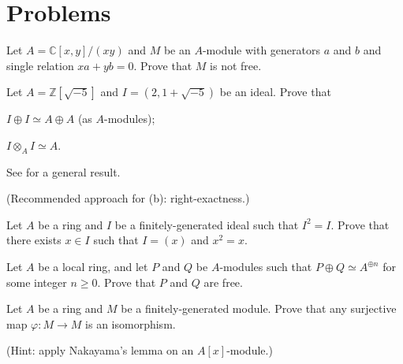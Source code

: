 \section{Problems}
\begin{problem}
\label{prob:diff_xy}
Let $A=\mathbb C[x,y]/(xy)$ and $M$ be an $A$-module with generators $a$ and $b$ and single relation $xa+yb=0$. Prove that $M$ is not free.
\end{problem}
\begin{problem}
\label{prob:Zsqrt-5}
Let $A=\mathbb Z[\sqrt{-5}]$ and $I = (2, 1+\sqrt{-5})$ be an ideal. Prove that
\begin{alphenum}
\item $I\oplus I\simeq A\oplus A$ (as $A$-modules);
\item $I\otimes_A I\simeq A$.
\end{alphenum}
See  for a general result.

(Recommended approach for (b): right-exactness.)
\end{problem}
\begin{problem}
Let $A$ be a ring and $I$ be a finitely-generated ideal 
such that $I^2=I$. Prove that there exists $x\in I$
such that $I=(x)$ and $x^2=x$.
\end{problem}
\begin{problem}
\label{prob:projective_module_local_ring}
Let $A$ be a local ring, and let $P$ and $Q$ be $A$-modules such that $P\oplus Q \simeq A^{\oplus n}$ for some integer $n\geq 0$. Prove that $P$ and $Q$ are free.
\end{problem}
\begin{problem}
\label{prob:surjective_map}
Let $A$ be a ring and $M$ be a finitely-generated module. Prove that any surjective map $\varphi : M\to M$ is an isomorphism.

(Hint: apply Nakayama's lemma on an $A[x]$-module.)
\end{problem}
